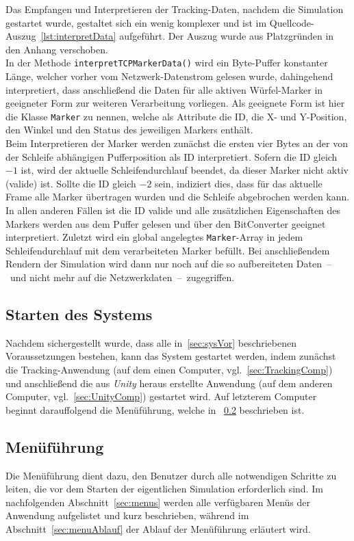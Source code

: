Das Empfangen und Interpretieren der Tracking-Daten, nachdem die Simulation gestartet wurde, gestaltet sich ein wenig komplexer und ist im Quellcode-Auszug~\ref{lst:interpretData} aufgeführt. Der Auszug wurde aus Platzgründen in den Anhang verschoben.\\
In der Methode \texttt{interpretTCPMarkerData()} wird ein Byte-Puffer konstanter Länge, welcher vorher vom Netzwerk-Datenstrom gelesen wurde, dahingehend interpretiert, dass anschließend die Daten für alle aktiven Würfel-Marker in geeigneter Form zur weiteren Verarbeitung vorliegen. Als geeignete Form ist hier die Klasse \texttt{Marker} zu nennen, welche als Attribute die ID, die X- und Y-Position, den Winkel und den Status des jeweiligen Markers enthält.\\ 
Beim Interpretieren der Marker werden zunächst die ersten vier Bytes an der von der Schleife abhängigen Pufferposition als ID interpretiert. Sofern die ID gleich $-1$ ist, wird der aktuelle Schleifendurchlauf beendet, da dieser Marker nicht aktiv (valide) ist. Sollte die ID gleich $-2$ sein, indiziert dies, dass für das aktuelle Frame alle Marker übertragen wurden und die Schleife abgebrochen werden kann. In allen anderen Fällen ist die ID valide und alle zusätzlichen Eigenschaften des Markers werden aus dem Puffer gelesen und über den BitConverter geeignet interpretiert. Zuletzt wird ein global angelegtes \texttt{Marker}-Array in jedem Schleifendurchlauf mit dem verarbeiteten Marker befüllt. Bei anschließendem Rendern der Simulation wird dann nur noch auf die so aufbereiteten Daten~--~und nicht mehr auf die Netzwerkdaten~--~zugegriffen.

\subsection{Starten des Systems}
Nachdem sichergestellt wurde, dass alle in~\ref{sec:sysVor} beschriebenen Voraussetzungen bestehen, kann das System gestartet werden, indem zunächst die Tracking-Anwendung (auf dem einen Computer, vgl.~\ref{sec:TrackingComp}) und anschließend die aus \emph{Unity} heraus erstellte Anwendung (auf dem anderen Computer, vgl.~\ref{sec:UnityComp}) gestartet wird. Auf letzterem Computer beginnt darauffolgend die Menüführung, welche in ~\ref{sec:menu} beschrieben ist.
\subsection{Menüführung}\label{sec:menu}
Die Menüführung dient dazu, den Benutzer durch alle notwendigen Schritte zu leiten, die vor dem Starten der eigentlichen Simulation erforderlich sind. Im nachfolgenden Abschnitt~\ref{sec:menus} werden alle verfügbaren Menüs der Anwendung aufgelistet und kurz beschrieben, während im Abschnitt~\ref{sec:menuAblauf} der Ablauf der Menüführung erläutert wird.


